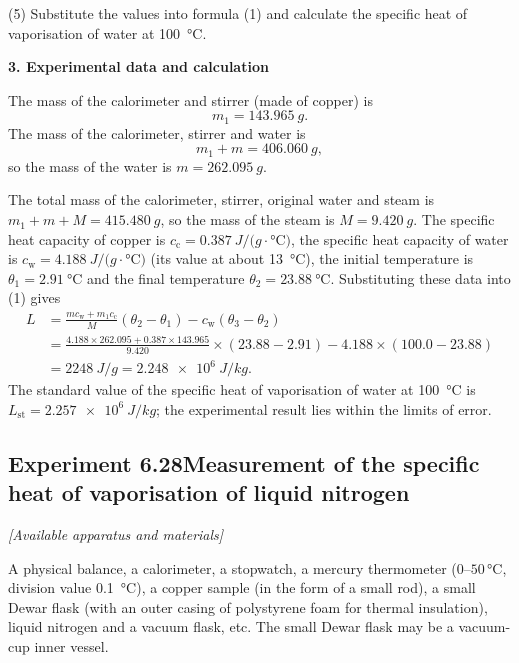 (5) Substitute the values into formula (1) and calculate the specific heat of vaporisation of water at \SI{100}{\celsius}.

\textbf{3. Experimental data and calculation}

The mass of the calorimeter and stirrer (made of copper) is
\begin{equation*}
m_1=\SI{143.965}{g}.
\end{equation*}
The mass of the calorimeter, stirrer and water is
\begin{equation*}
m_1+m=\SI{406.060}{g},
\end{equation*}
so the mass of the water is $m=\SI{262.095}{g}$.

The total mass of the calorimeter, stirrer, original water and steam is $m_1+m+M=\SI{415.480}{g}$, so the mass of the steam is $M=\SI{9.420}{g}$. The specific heat capacity of copper is $c_{\mathrm{c}}=\SI{0.387}{J/(g\cdot\celsius)}$, the specific heat capacity of water is $c_{\mathrm{w}}=\SI{4.188}{J/(g\cdot\celsius)}$ (its value at about \SI{13}{\celsius}), the initial temperature is $\theta_1=\SI{2.91}{\celsius}$ and the final temperature $\theta_2=\SI{23.88}{\celsius}$. Substituting these data into (1) gives
\begin{equation*}
\begin{aligned}
L&=\frac{mc_{\mathrm{w}}+m_1c_{\mathrm{c}}}{M}(\theta_2-\theta_1)-c_{\mathrm{w}}(\theta_3-\theta_2)\\
&=\frac{4.188\times262.095+0.387\times143.965}{9.420}\times(23.88-2.91)-4.188\times(100.0-23.88)\\
&=\SI{2248}{J/g}=\SI{2.248e6}{J/kg}.
\end{aligned}
\end{equation*}
The standard value of the specific heat of vaporisation of water at \SI{100}{\celsius} is $L_{\text{st}}=\SI{2.257e6}{J/kg}$; the experimental result lies within the limits of error.

\subsection*{Experiment 6.28\quad Measurement of the specific heat of vaporisation of liquid nitrogen}

\noindent\textit{[Available apparatus and materials]}

A physical balance, a calorimeter, a stopwatch, a mercury thermometer ($0$--$50$\,\si{\celsius}, division value \SI{0.1}{\celsius}), a copper sample (in the form of a small rod), a small Dewar flask (with an outer casing of polystyrene foam for thermal insulation), liquid nitrogen and a vacuum flask, etc. The small Dewar flask may be a vacuum-cup inner vessel.

